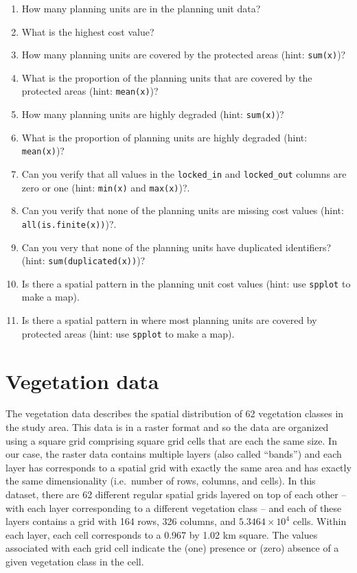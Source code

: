 \documentclass[
  12pt,
]{book}
\makeatletter
\providecommand{\tightlist}{%
  \setlength{\itemsep}{0pt}\setlength{\parskip}{0pt}}
\newenvironment{kframe}{%
\medskip{}
\setlength{\fboxsep}{.8em}
 \def\at@end@of@kframe{}%
 \ifinner\ifhmode%
  \def\at@end@of@kframe{\end{minipage}}%
  \begin{minipage}{\columnwidth}%
 \fi\fi%
 \def\FrameCommand##1{\hskip\@totalleftmargin \hskip-\fboxsep
 \colorbox{shadecolor}{##1}\hskip-\fboxsep
     \hskip-\linewidth \hskip-\@totalleftmargin \hskip\columnwidth}%
 \MakeFramed {\advance\hsize-\width
   \@totalleftmargin\z@ \linewidth\hsize
   \@setminipage}}%
 {\par\unskip\endMakeFramed%
 \at@end@of@kframe}
\newenvironment{rmdblock}[1]
  {
  \begin{itemize}
  \renewcommand{\labelitemi}{
    \raisebox{-.7\height}[0pt][0pt]{
      {\setkeys{Gin}{width=3em,keepaspectratio}\texttt{[image: images/\#1]}}
    }
  }
  \setlength{\fboxsep}{1em}
  \begin{kframe}
  \item
  }
  {
  \end{kframe}
  \end{itemize}
  }
\newenvironment{rmdquestion}
  {\begin{rmdblock}{question}}
  {\end{rmdblock}}
\makeatother
\begin{document}
\begin{rmdquestion}
\begin{enumerate}
\def\labelenumi{\arabic{enumi}.}
\tightlist
\item
  How many planning units are in the planning unit data?
\item
  What is the highest cost value?
\item
  How many planning units are covered by the protected areas (hint: \texttt{sum(x)})?
\item
  What is the proportion of the planning units that are covered by the protected areas (hint: \texttt{mean(x)})?
\item
  How many planning units are highly degraded (hint: \texttt{sum(x)})?
\item
  What is the proportion of planning units are highly degraded (hint: \texttt{mean(x)})?
\item
  Can you verify that all values in the \texttt{locked\_in} and \texttt{locked\_out} columns are zero or one (hint: \texttt{min(x)} and \texttt{max(x)})?.
\item
  Can you verify that none of the planning units are missing cost values (hint: \texttt{all(is.finite(x))})?.
\item
  Can you very that none of the planning units have duplicated identifiers? (hint: \texttt{sum(duplicated(x))})?
\item
  Is there a spatial pattern in the planning unit cost values (hint: use \texttt{spplot} to make a map).
\item
  Is there a spatial pattern in where most planning units are covered by protected areas (hint: use \texttt{spplot} to make a map).
\end{enumerate}
\end{rmdquestion}

\clearpage

\hypertarget{vegetation-data}{%
\section{Vegetation data}\label{vegetation-data}}

The vegetation data describes the spatial distribution of 62 vegetation classes in the study area. This data is in a raster format and so the data are organized using a square grid comprising square grid cells that are each the same size. In our case, the raster data contains multiple layers (also called ``bands'') and each layer has corresponds to a spatial grid with exactly the same area and has exactly the same dimensionality (i.e.~number of rows, columns, and cells). In this dataset, there are 62 different regular spatial grids layered on top of each other -- with each layer corresponding to a different vegetation class -- and each of these layers contains a grid with 164 rows, 326 columns, and \ensuremath{5.3464\times 10^{4}} cells. Within each layer, each cell corresponds to a 0.967 by 1.02 km square. The values associated with each grid cell indicate the (one) presence or (zero) absence of a given vegetation class in the cell.
\end{document}
